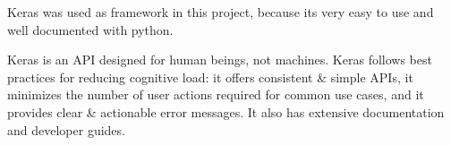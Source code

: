 \documentclass[../ImageClassifier.tex]{subfiles}
\begin{document}
    Keras was used as framework in this project, because its very easy to use and well documented with python.
    \begin{quoting}[begintext={``}, endtext={''\parencite{chollet2015keras}}]
        Keras is an API designed for human beings, not machines. Keras follows best practices for reducing cognitive load: it offers consistent \& simple APIs, it minimizes the number of user actions required for common use cases, and it provides clear \& actionable error messages. It also has extensive documentation and developer guides.
    \end{quoting}
\end{document}
